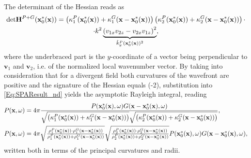 The determinant of the Hessian reads as
\begin{multline}
\label{Eq:HF_approx:H_det_Rayleigh}
\mathrm{det} \mathbf{H}^{P+G}(\mathbf{x}_0^*(\mathbf{x})) = 
\left(\kappa_1^P(\mathbf{x}_0^*(\mathbf{x})) + \kappa_1^G(\mathbf{x}-\mathbf{x}_0^*(\mathbf{x}))\right)
\left(\kappa_2^P(\mathbf{x}_0^*(\mathbf{x})) + \kappa_2^G(\mathbf{x}-\mathbf{x}_0^*(\mathbf{x}))\right)
\cdot \\ \cdot
k^2 \underbrace{\left( v_{1 x}v_{2 z}-v_{2 x}v_{1 z} \right)^2}_{\hat{k}_y^P(\mathbf{x}_0^*(\mathbf{x}))^2},
\end{multline}
where the underbraced part is the $y$-coordinate of a vector being perpendicular to $\mathbf{v}_1$ and $\mathbf{v}_2$, i.e. of the normalized local wavenumber vector.
By taking into consideration that for a divergent field both curvatures of the wavefront are positive and the signature of the Hessian equals (-2), substitution into \eqref{Eq:SPAResult_nd} yields the asymptotic Rayleigh integral, reading
\begin{align}
\label{eq:HF_approx:asymptotic_rayleigh}
P(\mathbf{x},\omega) &= 
4\pi \frac{P(\mathbf{x}_0^*(\mathbf{x}),\omega) G(\mathbf{x}-\mathbf{x}_0^*(\mathbf{x}),\omega)}
{\sqrt{\left(\kappa_1^P(\mathbf{x}_0^*(\mathbf{x})) + \kappa_1^G(\mathbf{x}-\mathbf{x}_0^*(\mathbf{x}))\right)}
\sqrt{\left(\kappa_2^P(\mathbf{x}_0^*(\mathbf{x})) + \kappa_2^G(\mathbf{x}-\mathbf{x}_0^*(\mathbf{x}))\right)}}, \\
P(\mathbf{x},\omega) &= 4\pi
\textstyle \sqrt{\frac{\rho_1^P(\mathbf{x}_0^*(\mathbf{x})) \cdot \rho_1^G(\mathbf{x}-\mathbf{x}_0^*(\mathbf{x}))}{\rho_1^P(\mathbf{x}_0^*(\mathbf{x})) + \rho_1^G(\mathbf{x}-\mathbf{x}_0^*(\mathbf{x}))}}
\sqrt{\frac{\rho_2^P(\mathbf{x}_0^*(\mathbf{x})) \cdot \rho_2^G(\mathbf{x}-\mathbf{x}_0^*(\mathbf{x}))}{\rho_2^P(\mathbf{x}_0^*(\mathbf{x})) + \rho_2^G(\mathbf{x}-\mathbf{x}_0^*(\mathbf{x}))}}
P(\mathbf{x}_0^*(\mathbf{x}),\omega) G(\mathbf{x}-\mathbf{x}_0^*(\mathbf{x}),\omega), \nonumber
\end{align}
written both in terms of the principal curvatures and radii.

